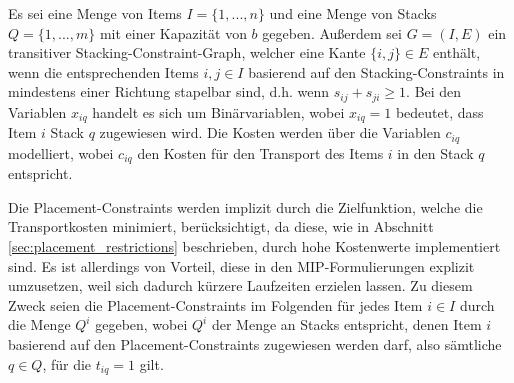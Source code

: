 Es sei eine Menge von Items $I = \{1, ..., n\}$ und eine Menge von Stacks $Q = \{1, ..., m\}$ mit einer Kapazität von $b$ gegeben.
Außerdem sei $G = (I, E)$ ein transitiver Stacking-Constraint-Graph, welcher eine Kante $\{i, j\} \in E$ enthält,
wenn die entsprechenden Items $i, j \in I$ basierend auf den Stacking-Constraints in mindestens einer Richtung stapelbar sind,
d.h. wenn $s_{ij} + s_{ji} \geq 1$.\newline
Bei den Variablen $x_{iq}$ handelt es sich um Binärvariablen, wobei $x_{iq} = 1$ bedeutet, dass Item $i$ Stack $q$ zugewiesen wird.
Die Kosten werden über die Variablen $c_{iq}$ modelliert, wobei $c_{iq}$ den Kosten für den Transport des Items $i$ in den Stack $q$
entspricht.

Die Placement-Constraints werden implizit durch die Zielfunktion, welche die Transportkosten minimiert, berücksichtigt,
da diese, wie in Abschnitt \ref{sec:placement_restrictions} beschrieben, durch hohe Kostenwerte implementiert sind.
Es ist allerdings von Vorteil, diese in den MIP-Formulierungen explizit umzusetzen, weil sich dadurch kürzere
Laufzeiten erzielen lassen. Zu diesem Zweck seien die Placement-Constraints im Folgenden für jedes Item $i \in I$
durch die Menge $Q^i$ gegeben, wobei $Q^i$ der Menge an Stacks entspricht, denen Item $i$ basierend auf den Placement-Constraints zugewiesen werden darf, also sämtliche $q \in Q$, für die $t_{iq} = 1$ gilt.




